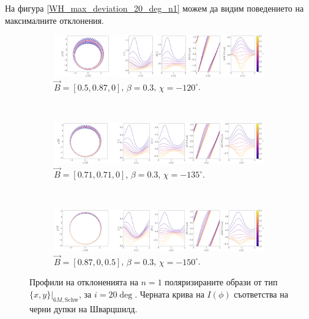На фигура \ref{WH_max_deviation_20_deg_n1} можем да видим поведението на максималните отклонения.

\newpage
\begin{figure}[!htb]
	\begin{subfigure}{12cm}
		\hspace{-0.5cm}
		\includegraphics[scale = 0.13]{WH_delta_fig_B_0.5_0.87_0_20_deg_r6_n1.png}
		\caption{$\vec{B} = [0.5, 0.87, 0]$, $\beta = 0.3$, $\chi = -120^\circ$.} 
	\end{subfigure}\\
	\begin{subfigure}{12cm}
		\hspace{-0.5cm}
		\includegraphics[scale = 0.13]{WH_delta_fig_B_0.71_0.71_0_20_deg_r6_n1.png}
		\caption{$\vec{B} = [0.71, 0.71, 0]$, $\beta = 0.3$, $\chi = -135^\circ$.}
	\end{subfigure}\\
	\begin{subfigure}{12cm}
		\hspace{-0.5cm}
		\includegraphics[scale = 0.13]{WH_delta_fig_B_0.87_0.5_0_20_deg_r6_n1.png}
		\caption{$\vec{B} = [0.87, 0, 0.5]$, $\beta = 0.3$, $\chi = -150^\circ$.}
	\end{subfigure}
	\caption[Профили на отклоненията на $n=1$ поляризираните образи oт тип $\{x,y\}\vert_{6M, \text{Schw}}$, за $i = 20\deg$.]{\small Профили на отклоненията на $n=1$ поляризираните образи от тип $\{x,y\}\vert_{6M, \text{Schw}}$, за $i = 20\deg$. Черната крива на $I(\phi)$ съответства на черни дупки на Шварцшилд.} 
	\label{WH_delta_r6_20_deg_n1}
\end{figure}

